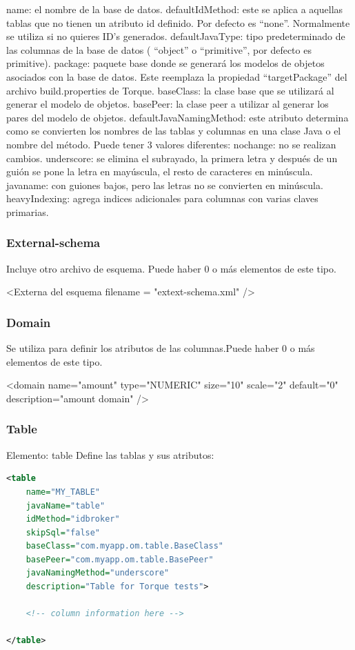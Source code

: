 \documentclass[12pt, oneside]{article}
\begin{document}
name: el nombre de la base de datos.
defaultIdMethod: este se aplica a aquellas tablas que no tienen un atributo id definido. Por defecto es “none”. Normalmente se utiliza si no quieres ID’s generados.
defaultJavaType: tipo predeterminado de las columnas de la base de datos ( “object” o “primitive”, por defecto es primitive).
package: paquete base donde se generará los modelos de objetos asociados con la base de datos. Este reemplaza la propiedad “targetPackage” del archivo build.properties de Torque.
baseClass: la clase base que se utilizará al generar el modelo de objetos.
basePeer: la clase peer a utilizar al generar los pares del modelo de objetos.
defaultJavaNamingMethod: este atributo determina como se convierten los nombres de las tablas y columnas en una clase Java o el nombre del método. Puede tener 3 valores diferentes:
nochange: no se realizan cambios.
underscore: se elimina el subrayado, la primera letra y después de un guión se pone la letra en mayúscula, el resto de caracteres en minúscula.
javaname: con guiones bajos, pero las letras no se convierten en minúscula.
heavyIndexing: agrega indices adicionales para columnas con varias claves primarias.

\subsubsection{External-schema}
Incluye otro archivo de esquema. Puede haber 0 o más elementos de este tipo.

<Externa del esquema
           		filename = "extext-schema.xml" />

\subsubsection{Domain}
Se utiliza para definir los atributos de las columnas.Puede haber 0 o más elementos de este tipo. 

<domain
           name="amount"
           type="NUMERIC"
           size="10"
           scale="2"
           default="0"
           description="amount domain" />

\subsubsection{Table}
Elemento: table
Define las tablas y sus atributos:

\begin{lstlisting}[language=XML]
<table
	name="MY_TABLE"
	javaName="table"
	idMethod="idbroker"
	skipSql="false"
	baseClass="com.myapp.om.table.BaseClass"
	basePeer="com.myapp.om.table.BasePeer"
	javaNamingMethod="underscore"
	description="Table for Torque tests">

	<!-- column information here -->

</table>
\end{lstlisting}
\end{document}
